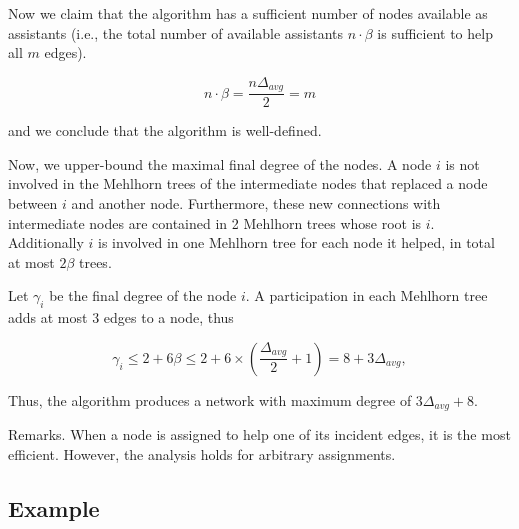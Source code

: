 \documentclass{article}
\begin{document}
\medskip

Now we claim that the algorithm has a sufficient number of nodes available as assistants
 (i.e., the total number of available assistants $n \cdot \beta$ is sufficient to help all $m$ edges).

  $$n \cdot \beta = \frac{n\Delta_{avg}}{2} = m$$

and we conclude that the algorithm is well-defined.

\medskip

Now, we upper-bound the maximal final degree of the nodes.
A node $i$ is not involved in the Mehlhorn trees of the intermediate nodes
that replaced a node between $i$ and another node.
Furthermore, these new connections with intermediate nodes are contained in 2 Mehlhorn trees
whose root is $i$. Additionally $i$ is involved in one Mehlhorn tree
for each node it helped, in total at most $2\beta$ trees.

Let $\gamma_i$ be the final degree of the node $i$.
A participation in each Mehlhorn tree adds at most $3$ edges to a node, thus

$$\gamma_i \leq 2 + 6\beta \leq 2 + 6 \times \left(\frac{\Delta_{avg}}{2}+1\right) = 8 + 3\Delta_{avg},$$

Thus, the algorithm produces a network
with maximum degree of $3\Delta_{avg} + 8$.

Remarks.
When a node is assigned to help one of its incident edges, it is the most efficient.
However, the analysis holds for arbitrary assignments.

\subsection{Example}
\end{document}
